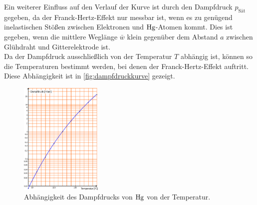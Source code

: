     Ein weiterer Einfluss auf den Verlauf der Kurve ist durch den Dampfdruck $p_\text{Sät}$ gegeben,
    da der Franck-Hertz-Effekt nur messbar ist,
    wenn es zu genügend inelastischen Stößen zwischen Elektronen und $\ce{Hg}$-Atomen kommt.
    Dies ist gegeben,
    wenn die mittlere Weglänge $\bar{w}$ klein gegenüber dem Abstand $a$ zwischen Glühdraht und Gitterelektrode ist.\\
    Da der Dampfdruck ausschließlich von der Temperatur $T$ abhängig ist,
    können so die Temperaturen bestimmt werden,
    bei denen der Franck-Hertz-Effekt auftritt.\\
    Diese Abhängigkeit ist in \autoref{fig:dampfdruckkurve} gezeigt.
    \begin{figure}[H]
        \centering
        \includegraphics[width=0.35\textwidth]{content/img/Abb_4.pdf}
        \caption{Abhängigkeit des Dampfdrucks von $\ce{Hg}$ von der Temperatur. \cite{versuchsanleitung}}
        \label{fig:dampfdruckkurve}
    \end{figure}

